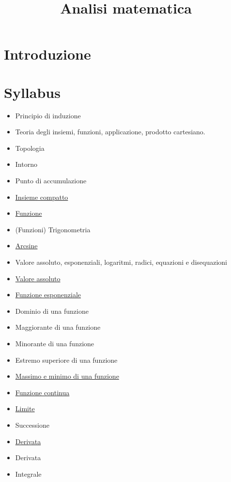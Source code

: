 \documentclass[a4paper,10pt]{article}
\title{Analisi matematica}
\author{}
\begin{document}
\maketitle


\section{Introduzione}

\section{Syllabus}
\begin{itemize}
 \item Principio di induzione
 \item Teoria degli insiemi, funzioni, applicazione, prodotto cartesiano.
 \item Topologia
 \item Intorno
 \item Punto di accumulazione
 \item \href{InsiemeCompatto.html}{Insieme compatto}
 \item \href{Funzione.html}{Funzione}
 \item (Funzioni) Trigonometria
 \item \href{Arcsine.html}{Arcsine}
 \item Valore assoluto, esponenziali, logaritmi, radici, equazioni e disequazioni
 \item \href{./ValoreAssoluto.html}{Valore assoluto}
 \item \href{./FunzioneEsponenziale.html}{Funzione esponenziale}
 \item Dominio di una funzione
 \item Maggiorante di una funzione
 \item Minorante di una funzione
 \item Estremo superiore di una funzione
 \item \href{FunzioneMassimoMinimo.html}{Massimo e minimo di una funzione}
 \item \href{FunzioneContinua.html}{Funzione continua}
 \item \href{Limite.html}{Limite}
 \item Successione
 \item \href{Derivata.html}{Derivata} 
 \item Derivata
 \item Integrale
\end{itemize}
\end{document}
